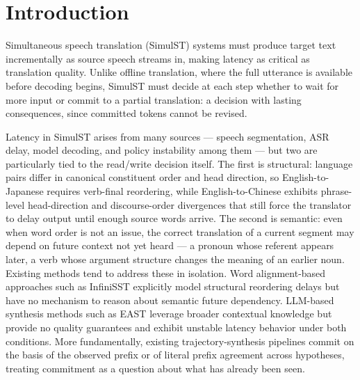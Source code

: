 \section{Introduction}
Simultaneous speech translation (SimulST) systems must produce target text incrementally as source speech streams in, making latency as critical as translation quality. Unlike offline translation, where the full utterance is available before decoding begins, SimulST must decide at each step whether to wait for more input or commit to a partial translation: a decision with lasting consequences, since committed tokens cannot be revised.

Latency in SimulST arises from many sources --- speech segmentation, ASR delay, model decoding, and policy instability among them --- but two are particularly tied to the read/write decision itself. The first is structural: language pairs differ in canonical constituent order and head direction, so English-to-Japanese requires verb-final reordering, while English-to-Chinese exhibits phrase-level head-direction and discourse-order divergences that still force the translator to delay output until enough source words arrive. The second is semantic: even when word order is not an issue, the correct translation of a current segment may depend on future context not yet heard --- a pronoun whose referent appears later, a verb whose argument structure changes the meaning of an earlier noun. Existing methods tend to address these in isolation. Word alignment-based approaches such as InfiniSST explicitly model structural reordering delays but have no mechanism to reason about semantic future dependency. LLM-based synthesis methods such as EAST leverage broader contextual knowledge but provide no quality guarantees and exhibit unstable latency behavior under both conditions. More fundamentally, existing trajectory-synthesis pipelines commit on the basis of the observed prefix or of literal prefix agreement across hypotheses, treating commitment as a question about what has already been seen.

